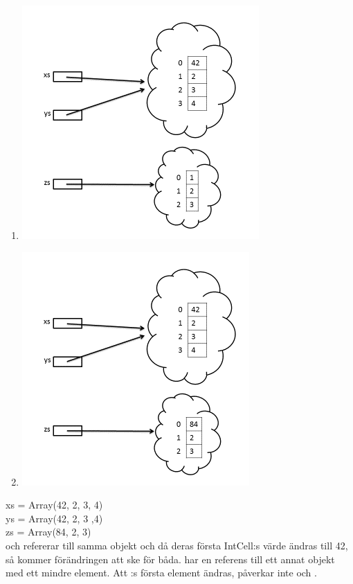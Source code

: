 \begin{enumerate}
\item \includegraphics[scale=1.2]{../img/w05-solutions/memory-pic-5}
\item \includegraphics[scale=1.2]{../img/w05-solutions/memory-pic-6}
\end{enumerate}
xs = Array(42, 2, 3, 4)\\
ys = Array(42, 2, 3 ,4)\\
zs = Array(84, 2, 3)\\
 och  refererar till samma objekt och då deras första IntCell:s värde ändras till 42, så kommer förändringen att ske för båda.
 har en referens till ett annat objekt med ett mindre element. Att :s första element ändras, påverkar inte  och .



\QUESTEND




